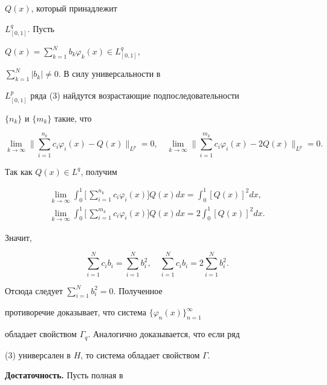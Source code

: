 $Q(x)$, который принадлежит 


$L^q_{[0,1]}$. Пусть 


$Q(x)=\sum\limits^N_{k=1}b_k\varphi_k(x)\in L^q_{[0,1]}$, 


$\sum\limits^N_{k=1}|b_k|\ne0$. В силу универсальности в 


$L^p_{[0,1]}$ ряда (3) найдутся возрастающие подпоследовательности 


$\{n_k\}$ и $\{m_k\}$ такие, что 


$$ 


\lim_{k\to\infty}\bigg\|\sum^{n_k}_{i=1}c_i\varphi_i(x)- 


Q(x)\bigg\|_{L^p}=0,\quad 


\lim_{k\to\infty}\bigg\|\sum^{m_k}_{i=1}c_i\varphi_i(x)- 


2Q(x)\bigg\|_{L^p}=0.


$$ 


Так как $Q(x)\in L^q$, получим 


\begin{gather*} 


\lim_{k\to\infty}\int^1_0\bigg[\,\sum^{n_k}_{i=1} 


c_i\varphi_i(x)\bigg]Q(x)dx=\int^1_0[Q(x)]^2dx, \\ 


% 


\lim_{k\to\infty}\int^1_0\bigg[\,\sum^{m_k}_{i=1} 


c_i\varphi_i(x)\bigg]Q(x)dx=2\int^1_0[Q(x)]^2dx.


\end{gather*} 


Значит, 


$$ 


\sum^N_{i=1}c_i b_i=\sum^N_{i=1}b^2_i,\quad 


\sum^N_{i=1}c_i b_i=2\sum^N_{i=1}b^2_i. 


$$ 


Отсюда следует $\sum\limits^N_{i=1}b^2_i=0$. Полученное 


противоречие доказывает, что система $\{\varphi_n(x)\}^\infty_{n=1}$ 


обладает свойством $\Gamma_q$. Аналогично доказывается, что если ряд 


(3) универсален в $H$, то система обладает свойством $\Gamma$. 


\medskip 


 


{\bf Достаточность.} Пусть полная в 


